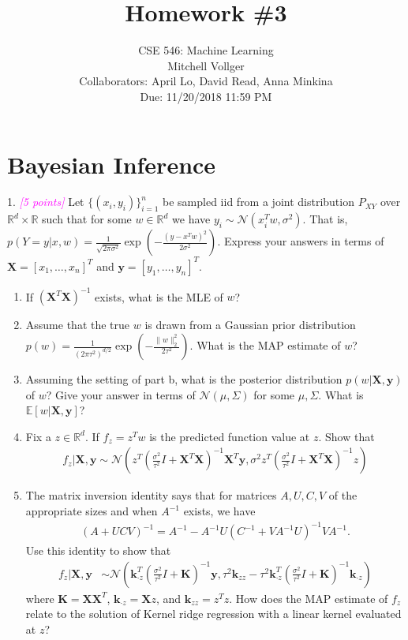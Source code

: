 \documentclass{article}
\date{{}}
\newcommand{\field}[1]{\mathbb{#1}}
\newcommand{\mb}[1]{\mathbf{#1}}
\newcommand{\1}{\mathbf{1}}
\newcommand{\E}{\mathbb{E}} %
\newcommand{\R}{\field{R}} %
\newcommand{\grade}[1]{\small\textcolor{magenta}{\emph{[#1 points]}} \normalsize}
\begin{document}
\title{Homework \#3}
\author{\normalsize{CSE 546: Machine Learning}\\
\normalsize{Mitchell Vollger} \\
\normalsize{Collaborators: April Lo, David Read, Anna Minkina} \\
\normalsize{Due: 11/20/2018  11:59 PM}}
\maketitle


\section{Bayesian Inference}

1. \grade{5} Let $\{(x_i,y_i)\}_{i=1}^n$ be sampled iid from a joint distribution $P_{XY}$ over $\R^d \times \R$ such that for some $w \in \R^d$ we have $y_i \sim \mathcal{N}(x_i^T w,\sigma^2)$. That is, $p(Y =y | x, w) = \frac{1}{\sqrt{2\pi\sigma^2}} \exp(-\frac{(y-x^T w)^2}{2\sigma^2})$. Express your answers in terms of $\mb{X} = [x_1,\dots,x_n]^T$ and $\mb{y} = [y_1,\dots,y_n]^T$.
\begin{enumerate}
  \item If $(\mb{X}^T \mb{X})^{-1}$ exists, what is the MLE of $w$?
  \item Assume that the true $w$ is drawn from a Gaussian prior distribution $p(w) = \frac{1}{(2 \pi \tau^2)^{d/2}} \exp(-\frac{\|w\|_2^2}{2\tau^2})$. What is the MAP estimate of $w$?
  \item Assuming the setting of part b, what is the posterior distribution $p(w| \mb{X}, \mb{y})$ of $w$? Give your answer in terms of $\mathcal{N}(\mu,\Sigma)$ for some $\mu,\Sigma$. What is $\E[w | \mb{X}, \mb{y} ]$?
  \item Fix a $z \in \R^d$. If $f_z = z^T w$ is the predicted function value at $z$. Show that
  \begin{align*}
    f_z | \mb{X},\mb{y} \sim \mathcal{N}( z^T( \tfrac{\sigma^2}{\tau^2}I + \mb{X}^T \mb{X})^{-1} \mb{X}^T \mb{y}, \sigma^2 z^T ( \tfrac{\sigma^2}{\tau^2}I + \mb{X}^T \mb{X})^{-1} z )
  \end{align*}
  \item The matrix inversion identity says that for matrices $A, U, C, V$ of the appropriate sizes and when $A^{-1}$ exists, we have
  \begin{align*}
    (A+UCV)^{-1} = A^{-1} - A^{-1} U (C^{-1} + V A^{-1} U)^{-1} V A^{-1}.
  \end{align*}
  Use this identity to show that
  \begin{align*}
    f_z | \mb{X},\mb{y} &\sim \mathcal{N}(\mb{k}_{\cdot z}^T( \tfrac{\sigma^2}{\tau^2} I+ \mb{K})^{-1} \mb{y} , \tau^2 \mb{k}_{zz} - \tau^2 \mb{k}_{\cdot z}^T( \tfrac{\sigma^2}{\tau^2} I+ \mb{K})^{-1}\mb{k}_{\cdot z})
  \end{align*}
  where $\mb{K} = \mb{X} \mb{X}^T$, $\mb{k}_{\cdot z} = \mb{X} z$, and $\mb{k}_{zz} = z^T z$.
  How does the MAP estimate of $f_z$ relate to the solution of Kernel ridge regression with a linear kernel evaluated at $z$? 
\end{enumerate}
\end{document}
